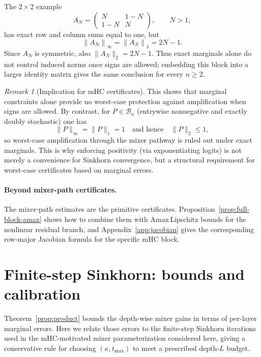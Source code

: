 \documentclass[11pt]{article}
\numberwithin{equation}{section}
\theoremstyle{plain}
\theoremstyle{definition}
\theoremstyle{remark}
\newtheorem{remark}[theorem]{Remark}
\newcommand{\cB}{\mathcal{B}}
\newcommand{\norm}[1]{\left\lVert #1 \right\rVert}
\newcommand{\Amax}{\textsf{Amax}\,}
\begin{document}
 
The $2\times2$ example
\begin{equation}\label{eq:AN_def}
A_N=\begin{pmatrix} N & 1-N\\ 1-N & N\end{pmatrix},
\qquad N>1,
\end{equation}
has exact row and column sums equal to one, but
\begin{equation}\label{eq:AN_norms}
\norm{A_N}_\infty=\norm{A_N}_1=2N-1.
\end{equation}
Since $A_N$ is symmetric, also $\|A_N\|_2=2N-1$. Thus exact marginals alone do not control induced norms once signs are allowed; embedding this block into a larger identity matrix gives the same conclusion for every $n\ge2$.

\begin{remark}[Implication for mHC certificates]
This shows that marginal constraints alone provide no worst-case protection against amplification when signs are allowed. By contrast, for $P\in\cB_n$ (entrywise nonnegative and exactly doubly stochastic) one has
\begin{equation}
\|P\|_\infty=\|P\|_1=1
\quad\text{and hence}\quad
\|P\|_2\le 1,
\end{equation}
so worst-case amplification through the mixer pathway is ruled out under exact marginals. This is why enforcing positivity (via exponentiating logits) is not merely a convenience for Sinkhorn convergence, but a structural requirement for worst-case certificates based on marginal errors.
\end{remark}

\paragraph{Beyond mixer-path certificates.}
The mixer-path estimates are the primitive certificates. Proposition~\ref{prop:full-block-amax} shows how to combine them with \Amax Lipschitz bounds for the nonlinear residual branch, and Appendix~\ref{app:jacobian} gives the corresponding row-major Jacobian formula for the specific mHC block.

\section{Finite-step Sinkhorn: bounds and calibration}\label{sec:sinkhorn}

Theorem~\ref{prop:product} bounds the depth-wise mixer gains in terms of per-layer marginal errors. Here we relate those
errors to the finite-step Sinkhorn iterations used in the mHC-motivated mixer parameterization considered here, giving a conservative rule for choosing
$(\kappa,t_{\max})$ to meet a prescribed depth-$L$ budget.
\end{document}
